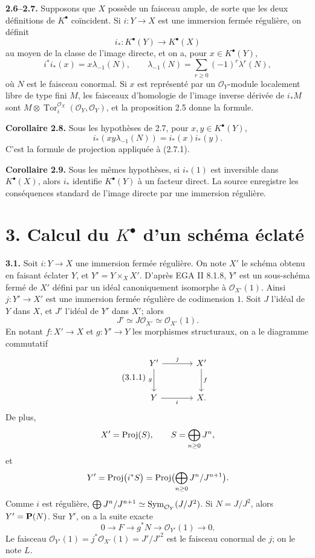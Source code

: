 \documentclass[11pt]{article}
\newcommand{\Tor}{\operatorname{Tor}}
\providecommand{\Tor}{\operatorname{Tor}}
\providecommand{\cO}{\mathcal O}
\begin{document}
\textbf{2.6--2.7.} Supposons que \(X\) possède un faisceau ample, de sorte que les deux définitions de \(K^\bullet\) coïncident. Si \(i:Y\to X\) est une immersion fermée régulière, on définit
\[
i_*:K^\bullet(Y)\to K^\bullet(X)
\]
au moyen de la classe de l'image directe, et on a, pour \(x\in K^\bullet(Y)\),
\begin{equation}\tag{2.7.1}
i^*i_*(x)=x\lambda_{-1}(N),
\qquad
\lambda_{-1}(N)=\sum_{r\ge0}(-1)^r\lambda^r(N),
\end{equation}
où \(N\) est le faisceau conormal. Si \(x\) est représenté par un \(\cO_Y\)-module localement libre de type fini \(M\), les faisceaux d'homologie de l'image inverse dérivée de \(i_*M\) sont \(M\otimes\Tor_i^{\cO_X}(\cO_Y,\cO_Y)\), et la proposition 2.5 donne la formule.

\textbf{Corollaire 2.8.} Sous les hypothèses de 2.7, pour \(x,y\in K^\bullet(Y)\),
\begin{equation}\tag{2.8.1}
i_*(xy\lambda_{-1}(N))=i_*(x)i_*(y).
\end{equation}
C'est la formule de projection appliquée à (2.7.1).

\textbf{Corollaire 2.9.} Sous les mêmes hypothèses, si \(i_*(1)\) est inversible dans \(K^\bullet(X)\), alors \(i_*\) identifie \(K^\bullet(Y)\) à un facteur direct. La source enregistre les conséquences standard de l'image directe par une immersion régulière.

\section*{3. Calcul du \texorpdfstring{$K^\bullet$}{K} d'un schéma éclaté}

\textbf{3.1.} Soit \(i:Y\to X\) une immersion fermée régulière. On note \(X'\) le schéma obtenu en faisant éclater \(Y\), et \(Y'=Y\times_X X'\). D'après EGA II 8.1.8, \(Y'\) est un sous-schéma fermé de \(X'\) défini par un idéal canoniquement isomorphe à \(\cO_{X'}(1)\). Ainsi \(j:Y'\to X'\) est une immersion fermée régulière de codimension \(1\). Soit \(J\) l'idéal de \(Y\) dans \(X\), et \(J'\) l'idéal de \(Y'\) dans \(X'\); alors
\[
J'\simeq J\cO_{X'}\simeq\cO_{X'}(1).
\]
En notant \(f:X'\to X\) et \(g:Y'\to Y\) les morphismes structuraux, on a le diagramme commutatif
\begin{equation}\tag{3.1.1}
\begin{tikzcd}[column sep=large,row sep=large]
Y' \arrow[r,"j"] \arrow[d,"g"'] & X' \arrow[d,"f"]\\
Y \arrow[r,"i"'] & X.
\end{tikzcd}
\end{equation}
De plus,
\[
X'=\operatorname{Proj}(S),\qquad S=\bigoplus_{n\ge0}J^n,
\]
et
\[
Y'=\operatorname{Proj}\bigl(i^*S\bigr)
=\operatorname{Proj}\bigl(\bigoplus_{n\ge0}J^n/J^{n+1}\bigr).
\]
Comme \(i\) est régulière, \(\bigoplus J^n/J^{n+1}\simeq\Sym_{\cO_Y}(J/J^2)\). Si \(N=J/J^2\), alors \(Y'=\mathbf P(N)\). Sur \(Y'\), on a la suite exacte
\begin{equation}\tag{3.1.2}
0\to F\to g^*N\to\cO_{Y'}(1)\to0.
\end{equation}
Le faisceau \(\cO_{Y'}(1)=j^*\cO_{X'}(1)=J'/J'^2\) est le faisceau conormal de \(j\); on le note \(L\).
\end{document}
